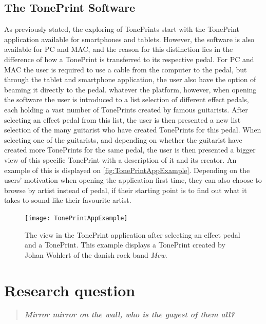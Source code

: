 \subsection{The TonePrint Software}
\label{TonePrintSoftware}
As previously stated, the exploring of TonePrints start with the TonePrint application available for smartphones and tablets. However, the software is also available for PC and MAC, and the reason for this distinction lies in the difference of how a TonePrint is transferred to its respective pedal. For PC and MAC the user is required to use a cable from the computer to the pedal, but through the tablet and smartphone application, the user also have the option of beaming it directly to the pedal. whatever the platform, however, when opening the software the user is introduced to a list selection of different effect pedals, each holding a vast number of TonePrints created by famous guitarists. After selecting an effect pedal from this list, the user is then presented a new list selection of the many guitarist who have created TonePrints for this pedal. When selecting one of the guitarists, and depending on whether the guitarist have created more TonePrints for the same pedal, the user is then presented a bigger view of this specific TonePrint with a description of it and its creator. An example of this is displayed on \autoref{fig:TonePrintAppExample}. Depending on the users' motivation when opening the application first time, they can also choose to browse by artist instead of pedal, if their starting point is to find out what it takes to sound like their favourite artist.
%
\begin{figure}[H]
	\centering
	\texttt{[image: TonePrintAppExample]}
	\caption{The view in the TonePrint application after selecting an effect pedal and a TonePrint. This example displays a TonePrint created by Johan Wohlert of the danish rock band \textit{Mew}.}
	\label{fig:TonePrintAppExample}
\end{figure}
%
\section{Research question}
\label{ResearchQuestion}

\begin{quote}
	\textbf{\textit{Mirror mirror on the wall, who is the gayest of them all?}}
\end{quote}

